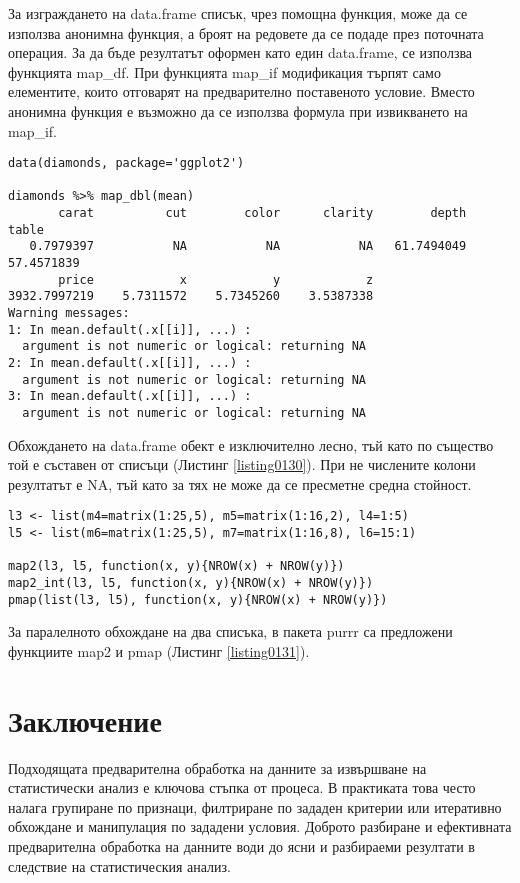 За изграждането на data.frame списък, чрез помощна функция, може да се използва анонимна функция, а броят на редовете да се подаде през поточната операция. За да бъде резултатът оформен като един data.frame, се използва функцията map\_df. При функцията map\_if модификация търпят само елементите, които отговарят на предварително поставеното условие. Вместо анонимна функция е възможно да се използва формула при извикването на map\_if.

\begin{lstlisting}[caption=Обхождане на data.frame, label=listing0130]
data(diamonds, package='ggplot2')

diamonds %>% map_dbl(mean)
       carat          cut        color      clarity        depth        table 
   0.7979397           NA           NA           NA   61.7494049   57.4571839 
       price            x            y            z 
3932.7997219    5.7311572    5.7345260    3.5387338 
Warning messages:
1: In mean.default(.x[[i]], ...) :
  argument is not numeric or logical: returning NA
2: In mean.default(.x[[i]], ...) :
  argument is not numeric or logical: returning NA
3: In mean.default(.x[[i]], ...) :
  argument is not numeric or logical: returning NA
\end{lstlisting}

Обхождането на data.frame обект е изключително лесно, тъй като по същество той е съставен от списъци (Листинг \ref{listing0130}). При не числените колони резултатът е NA, тъй като за тях не може да се пресметне средна стойност.

\begin{lstlisting}[caption=Едновременно обхождане на два списъка, label=listing0131]
l3 <- list(m4=matrix(1:25,5), m5=matrix(1:16,2), l4=1:5)
l5 <- list(m6=matrix(1:25,5), m7=matrix(1:16,8), l6=15:1)

map2(l3, l5, function(x, y){NROW(x) + NROW(y)})
map2_int(l3, l5, function(x, y){NROW(x) + NROW(y)})
pmap(list(l3, l5), function(x, y){NROW(x) + NROW(y)})
\end{lstlisting}

За паралелното обхождане на два списъка, в пакета purrr са предложени функциите map2 и pmap (Листинг \ref{listing0131}).

\section*{Заключение}

Подходящата предварителна обработка на данните за извършване на статистически анализ е ключова стъпка от процеса. В практиката това често налага групиране по признаци, филтриране по зададен критерии или итеративно обхождане и манипулация по зададени условия. Доброто разбиране и ефективната предварителна обработка на данните води до ясни и разбираеми резултати в следствие на статистическия анализ.

